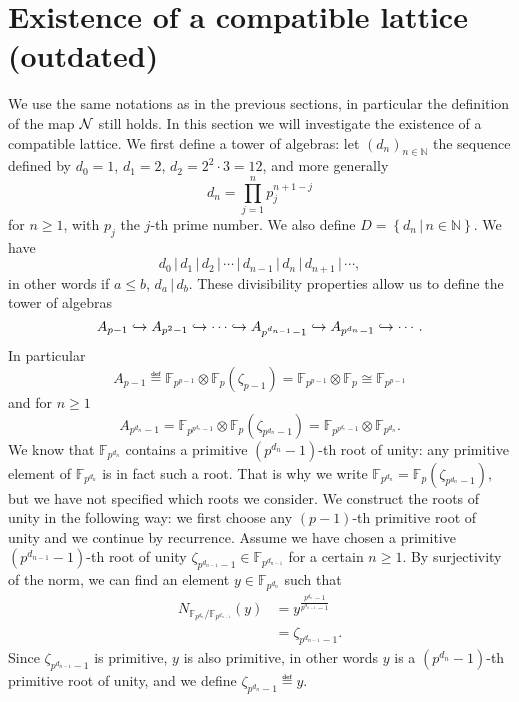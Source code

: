 \documentclass[a4paper,11pt]{article}
\begin{document}
\section{Existence of a compatible lattice (outdated)}
\label{sec:existence-out}
We use the same notations as in the previous sections, in particular the
definition of the map $\mathcal N$ still holds.
In this section we will investigate the existence of a compatible lattice. We
first define a tower of algebras: let $(d_n)_{n\in\mathbb{N}}$ the sequence
defined by $d_0=1$, $d_1=2$, $d_2=2^2\cdot 3=12$, and more generally
\[
  d_n = \prod_{j=1}^n p_j^{n+1-j}
\]
for $n\geq1$, with $p_j$ the $j$-th prime number. We also define
$D=\left\{d_n\,|\,n\in\mathbb{N}\right\}$. We have 
\[
  d_0\,|\,d_1\,|\,d_2\,|\,\cdots\,|\,d_{n-1}\,|\,d_n\,|\,d_{n+1}\,|\,\cdots,
\]
in other words if $a\leq b$, $d_a\,|\,d_b$. These divisibility properties allow
us to define the tower of algebras
\[
  A_{p-1}\hookrightarrow A_{p^{2}-1}\hookrightarrow\cdots\hookrightarrow A_{p^{d_{n-1}}-1}\hookrightarrow
  A_{p^{d_n}-1}\hookrightarrow\cdots.
\]
In particular
\[
  A_{p-1}\eqdef
\mathbb{F}_{p^{p-1}}\otimes\mathbb{F}_{p}(\zeta_{p-1})=\mathbb{F}_{p^{p-1}}\otimes\mathbb{F}_p\cong\mathbb{F}_{p^{p-1}}
\]
and for $n\geq1$
\[
  A_{p^{d_n}-1}=\mathbb{F}_{p^{p^{d_n}-1}}\otimes\mathbb{F}_p(\zeta_{p^{d_n}-1})=\mathbb{F}_{p^{p^{d_n}-1}}\otimes\mathbb{F}_{p^{d_n}}.
\]
We know that $\mathbb{F}_{p^{d_n}}$ contains a primitive $(p^{d_n}-1)$-th root
of unity: any primitive element of $\mathbb{F}_{p^{d_n}}$ is in fact such a
root. That is why we write
$\mathbb{F}_{p^{d_n}}=\mathbb{F}_{p}(\zeta_{p^{d_n}-1})$, but we have not
specified which roots we consider.
We construct the roots of unity in the following way: we first choose any $(p-1)$-th primitive root of unity and we continue by recurrence. Assume we have
chosen a primitive $(p^{d_{n-1}}-1)$-th root of unity
$\zeta_{p^{d_{n-1}}-1}\in\mathbb{F}_{p^{d_{n-1}}}$
for a certain $n\geq1$. By surjectivity of the norm, we can find an element
$y\in\mathbb{F}_{p^{d_n}}$ such that
\begin{align*}
  N_{\mathbb{F}_{p^{d_n}}/\mathbb{F}_{p^{d_{n-1}}}}(y)&=y^{\frac{p^{d_n}-1}{p^{d_{n-1}}-1}}\\
  &=\zeta_{p^{d_{n-1}}-1}.
\end{align*}
Since $\zeta_{p^{d_{n-1}}-1}$ is primitive, $y$ is also primitive, in other
words $y$ is a $(p^{d_n}-1)$-th primitive root of unity, and we define
$\zeta_{p^{d_n}-1}\eqdef y$.
\end{document}
